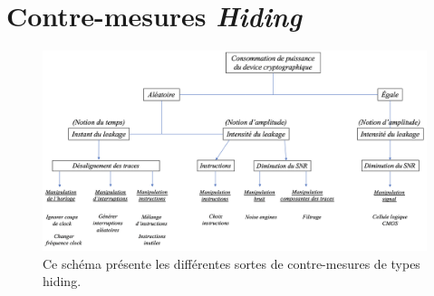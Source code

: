\documentclass[10pt, oneside, a4paper]{article}
\begin{document}






\newpage

\section{Contre-mesures \textit{Hiding}}
\label{ann:resume_hiding}
\begin{figure}[htb]
    \centering
    \includegraphics[width=1.2\linewidth, angle=90]{image/resume_hiding}
    \caption{Ce schéma présente les différentes sortes de contre-mesures de types hiding.}
    \label{fig:resume_hiding} 
\end{figure}

\newpage
\end{document}
